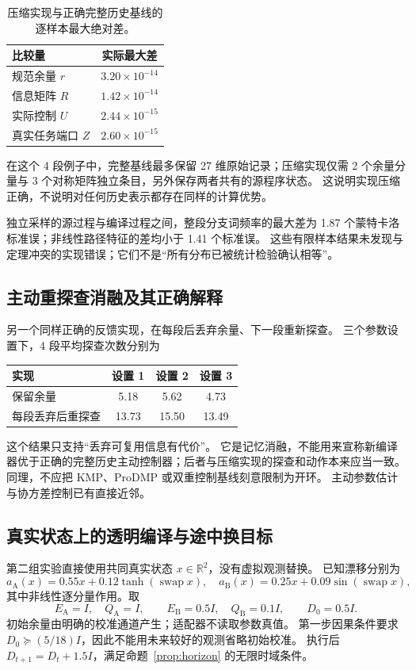 \documentclass[UTF8,fontset=fandol,11pt,a4paper]{ctexart}
\newcommand{\R}{\mathbb R}
\theoremstyle{definition}
\theoremstyle{remark}
\numberwithin{equation}{section}
\begin{document}
\begin{table}[htbp]
\centering
\caption{压缩实现与正确完整历史基线的逐样本最大绝对差。}
\begin{tabular}{@{}lc@{}}
\toprule
比较量 & 实际最大差 \\
\midrule
规范余量 $r$ & $3.20\times10^{-14}$ \\
信息矩阵 $R$ & $1.42\times10^{-14}$ \\
实际控制 $U$ & $2.44\times10^{-15}$ \\
真实任务端口 $Z$ & $2.60\times10^{-15}$ \\
\bottomrule
\end{tabular}
\end{table}

在这个 4 段例子中，完整基线最多保留 27 维原始记录；压缩实现仅需 2 个余量分量与 3 个对称矩阵独立条目，另外保存两者共有的源程序状态。
这说明实现压缩正确，不说明对任何历史表示都存在同样的计算优势。

独立采样的源过程与编译过程之间，整段分支词频率的最大差为 1.87 个蒙特卡洛标准误；非线性路径特征的差均小于 1.41 个标准误。
这些有限样本结果未发现与定理冲突的实现错误；它们不是“所有分布已被统计检验确认相等”。

\subsection{主动重探查消融及其正确解释}
另一个同样正确的反馈实现，在每段后丢弃余量、下一段重新探查。
三个参数设置下，4 段平均探查次数分别为
\begin{center}
\begin{tabular}{@{}lccc@{}}
\toprule
实现 & 设置 1 & 设置 2 & 设置 3 \\
\midrule
保留余量 & 5.18 & 5.62 & 4.73 \\
每段丢弃后重探查 & 13.73 & 15.50 & 13.49 \\
\bottomrule
\end{tabular}
\end{center}
这个结果只支持“丢弃可复用信息有代价”。
它是记忆消融，不能用来宣称新编译器优于正确的完整历史主动控制器；后者与压缩实现的探查和动作本来应当一致。
同理，不应把 KMP、ProDMP 或双重控制基线刻意限制为开环。
主动参数估计与协方差控制已有直接近邻\cite{dual}。

\subsection{真实状态上的透明编译与途中换目标}
第二组实验直接使用共同真实状态 $x\in\R^2$，没有虚拟观测替换。
已知漂移分别为
\begin{equation}
 a_{\mathrm A}(x)=0.55x+0.12\tanh(\operatorname{swap}x),\quad
 a_{\mathrm B}(x)=0.25x+0.09\sin(\operatorname{swap}x),
\end{equation}
其中非线性逐分量作用。取
\begin{equation}
 E_{\mathrm A}=I,\quad Q_{\mathrm A}=I,\qquad
 E_{\mathrm B}=0.5I,\quad Q_{\mathrm B}=0.1I,\qquad D_0=0.5I.
\end{equation}
初始余量由明确的校准通道产生；适配器不读取参数真值。
第一步因果条件要求 $D_0\succeq(5/18)I$，因此不能用未来较好的观测省略初始校准。
执行后 $D_{t+1}=D_t+1.5I$，满足命题~\ref{prop:horizon} 的无限时域条件。
\end{document}
